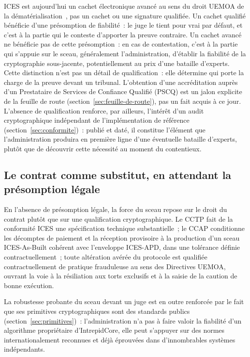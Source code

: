 \documentclass[11pt,a4paper]{article}
\begin{document}
ICES est aujourd'hui un cachet électronique avancé au sens du droit UEMOA de la dématérialisation~\cite{uemoa2023}, pas un cachet ou une signature qualifiée. Un cachet qualifié bénéficie d'une présomption de fiabilité~: le juge le tient pour vrai par défaut, et c'est à la partie qui le conteste d'apporter la preuve contraire. Un cachet avancé ne bénéficie pas de cette présomption~: en cas de contestation, c'est à la partie qui s'appuie sur le sceau, généralement l'administration, d'établir la fiabilité de la cryptographie sous-jacente, potentiellement au prix d'une bataille d'experts. Cette distinction n'est pas un détail de qualification~: elle détermine qui porte la charge de la preuve devant un tribunal. L'obtention d'une accréditation auprès d'un Prestataire de Services de Confiance Qualifié (PSCQ) est un jalon explicite de la feuille de route (section~\ref{sec:feuille-de-route}), pas un fait acquis à ce jour. L'absence de qualification renforce, par ailleurs, l'intérêt d'un audit cryptographique indépendant de l'implémentation de référence (section~\ref{sec:conformite})~: publié et daté, il constitue l'élément que l'administration produira en première ligne d'une éventuelle bataille d'experts, plutôt que de découvrir cette nécessité au moment du contentieux.

\subsection{Le contrat comme substitut, en attendant la présomption légale}

En l'absence de présomption légale, la force du sceau repose sur le droit du contrat plutôt que sur une qualification cryptographique. Le CCTP fait de la conformité ICES une spécification technique substantielle~; le CCAP conditionne les décomptes de paiement et la réception provisoire à la production d'un sceau ICES-As-Built cohérent avec l'enveloppe ICES-APD, dans une tolérance définie contractuellement~; toute altération avérée du protocole est qualifiée contractuellement de pratique frauduleuse au sens des Directives UEMOA, ouvrant la voie à la résiliation aux torts exclusifs et à la saisie de la caution de bonne exécution.

La robustesse probante du sceau devant un juge est en outre renforcée par le fait que ses primitives cryptographiques sont des standards publics (section~\ref{sec:primitives})~: l'administration n'a pas à faire valoir la fiabilité d'un algorithme propriétaire d'IntrepidCore, elle peut s'appuyer sur des normes internationalement reconnues et déjà éprouvées dans d'innombrables systèmes indépendants.
\end{document}
